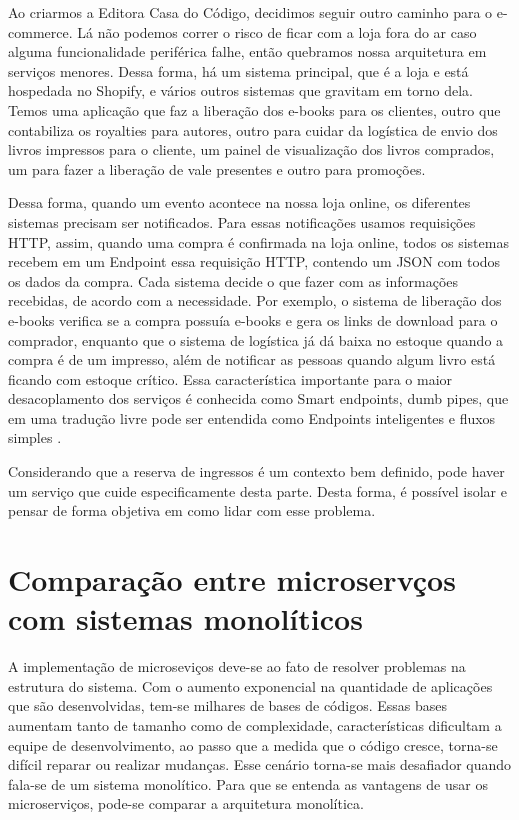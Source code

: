 \begin{citacao}

Ao criarmos a Editora Casa do Código, decidimos seguir outro caminho para o e-commerce.
Lá não podemos correr o risco de ficar com a loja fora do ar caso alguma funcionalidade
periférica falhe, então quebramos nossa arquitetura em serviços menores. Dessa forma, há
um sistema principal, que é a loja e está hospedada no Shopify, e vários outros sistemas
que gravitam em torno dela. Temos uma aplicação que faz a liberação dos e-books para os
clientes, outro que contabiliza os royalties para autores, outro para cuidar da logística
de envio dos livros impressos para o cliente, um painel de visualização dos livros comprados,
um para fazer a liberação de vale presentes e outro para promoções.

Dessa forma, quando um evento acontece na nossa loja online, os diferentes sistemas precisam
ser notificados. Para essas notificações usamos requisições HTTP, assim, quando uma compra
é confirmada na loja online, todos os sistemas recebem em um Endpoint essa requisição HTTP,
contendo um JSON com todos os dados da compra. Cada sistema decide o que fazer com as informações
recebidas, de acordo com a necessidade. Por exemplo, o sistema de liberação dos e-books verifica
se a compra possuía e-books e gera os links de download para o comprador, enquanto que o sistema
de logística já dá baixa no estoque quando a compra é de um impresso, além de notificar as pessoas
quando algum livro está ficando com estoque crítico. Essa característica importante para o maior
desacoplamento dos serviços é conhecida como Smart endpoints, dumb pipes, que em uma tradução
livre pode ser entendida como Endpoints inteligentes e fluxos
simples \cite{arquitetura-de-microservicos-ou-monolitica}.

\end{citacao}


Considerando que a reserva de ingressos é um contexto bem definido, pode haver um serviço que cuide
especificamente desta parte. Desta forma, é possível isolar e pensar de forma objetiva em como
lidar com esse problema.

\section{Comparação entre microservços com sistemas monolíticos}\label{microservicos}
A implementação de microseviços deve-se ao fato de resolver problemas na estrutura do sistema. Com o aumento exponencial
na quantidade de aplicações que são desenvolvidas, tem-se milhares de bases de códigos. Essas bases
aumentam tanto de tamanho como de complexidade, características dificultam a equipe de desenvolvimento, ao passo que a
medida que o código cresce, torna-se difícil reparar ou realizar mudanças. Esse cenário torna-se mais desafiador quando
fala-se de um sistema monolítico. Para que se entenda as vantagens de usar os microserviços, pode-se comparar a arquitetura
monolítica.


